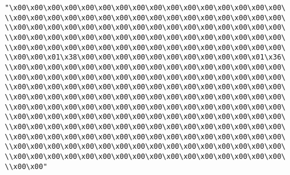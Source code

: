 \verb|"\x00\x00\x00\x00\x00\x00\x00\x00\x00\x00\x00\x00\x00\x00\x00\x00\|\newline
\verb|\\x00\x00\x00\x00\x00\x00\x00\x00\x00\x00\x00\x00\x00\x00\x00\x00\|\newline
\verb|\\x00\x00\x00\x00\x00\x00\x00\x00\x00\x00\x00\x00\x00\x00\x00\x00\|\newline
\verb|\\x00\x00\x00\x00\x00\x00\x00\x00\x00\x00\x00\x00\x00\x00\x00\x00\|\newline
\verb|\\x00\x00\x00\x00\x00\x00\x00\x00\x00\x00\x00\x00\x00\x00\x00\x00\|\newline
\verb|\\x00\x00\x01\x38\x00\x00\x00\x00\x00\x00\x00\x00\x00\x00\x01\x36\|\newline
\verb|\\x00\x00\x00\x00\x00\x00\x00\x00\x00\x00\x00\x00\x00\x00\x00\x00\|\newline
\verb|\\x00\x00\x00\x00\x00\x00\x00\x00\x00\x00\x00\x00\x00\x00\x00\x00\|\newline
\verb|\\x00\x00\x00\x00\x00\x00\x00\x00\x00\x00\x00\x00\x00\x00\x00\x00\|\newline
\verb|\\x00\x00\x00\x00\x00\x00\x00\x00\x00\x00\x00\x00\x00\x00\x00\x00\|\newline
\verb|\\x00\x00\x00\x00\x00\x00\x00\x00\x00\x00\x00\x00\x00\x00\x00\x00\|\newline
\verb|\\x00\x00\x00\x00\x00\x00\x00\x00\x00\x00\x00\x00\x00\x00\x00\x00\|\newline
\verb|\\x00\x00\x00\x00\x00\x00\x00\x00\x00\x00\x00\x00\x00\x00\x00\x00\|\newline
\verb|\\x00\x00\x00\x00\x00\x00\x00\x00\x00\x00\x00\x00\x00\x00\x00\x00\|\newline
\verb|\\x00\x00\x00\x00\x00\x00\x00\x00\x00\x00\x00\x00\x00\x00\x00\x00\|\newline
\verb|\\x00\x00\x00\x00\x00\x00\x00\x00\x00\x00\x00\x00\x00\x00\x00\x00\|\newline
\verb|\\x00\x00"|\newline
